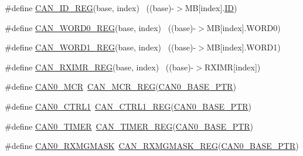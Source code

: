 \begin{DoxyCompactItemize}
\item 
\#define \hyperlink{group___c_a_n___register___accessor___macros_ga081389bb65f5ba1945fa2984d057044e}{C\+A\+N\+\_\+\+I\+D\+\_\+\+R\+EG}(base,  index)                                  ~((base)-\/$>$MB\mbox{[}index\mbox{]}.\hyperlink{samr21__xpro_200std__low__power__mode_200std__low__power__mode_8c_a77ceac8d6af195fe72f95f6afd87c45e}{ID})
\item 
\#define \hyperlink{group___c_a_n___register___accessor___macros_gab486ab7c313c1c3ab3ea1d146a4e4597}{C\+A\+N\+\_\+\+W\+O\+R\+D0\+\_\+\+R\+EG}(base,  index)                            ~((base)-\/$>$MB\mbox{[}index\mbox{]}.W\+O\+R\+D0)
\item 
\#define \hyperlink{group___c_a_n___register___accessor___macros_gabea0fd7f957d3c4e7770f1670aff54dc}{C\+A\+N\+\_\+\+W\+O\+R\+D1\+\_\+\+R\+EG}(base,  index)                            ~((base)-\/$>$MB\mbox{[}index\mbox{]}.W\+O\+R\+D1)
\item 
\#define \hyperlink{group___c_a_n___register___accessor___macros_gabcdb674583aff011e9cae0837f6abd5a}{C\+A\+N\+\_\+\+R\+X\+I\+M\+R\+\_\+\+R\+EG}(base,  index)                            ~((base)-\/$>$R\+X\+I\+MR\mbox{[}index\mbox{]})
\item 
\#define \hyperlink{group___c_a_n___register___accessor___macros_ga300565478bb512e7ca03af0ecf31137a}{C\+A\+N0\+\_\+\+M\+CR}~\hyperlink{group___c_a_n___register___accessor___macros_ga266f3270836a0e2113e665b27e8469c3}{C\+A\+N\+\_\+\+M\+C\+R\+\_\+\+R\+EG}(\hyperlink{group___c_a_n___peripheral_ga1ee8f499e10af9b8e3132e0168e519b9}{C\+A\+N0\+\_\+\+B\+A\+S\+E\+\_\+\+P\+TR})
\item 
\#define \hyperlink{group___c_a_n___register___accessor___macros_gacd647d438a70b740aca411d35aee6de2}{C\+A\+N0\+\_\+\+C\+T\+R\+L1}~\hyperlink{group___c_a_n___register___accessor___macros_gacb8258cf058657f2e55abcfb40b99344}{C\+A\+N\+\_\+\+C\+T\+R\+L1\+\_\+\+R\+EG}(\hyperlink{group___c_a_n___peripheral_ga1ee8f499e10af9b8e3132e0168e519b9}{C\+A\+N0\+\_\+\+B\+A\+S\+E\+\_\+\+P\+TR})
\item 
\#define \hyperlink{group___c_a_n___register___accessor___macros_ga962b913ec16b41232cddb038bdbbf47b}{C\+A\+N0\+\_\+\+T\+I\+M\+ER}~\hyperlink{group___c_a_n___register___accessor___macros_ga1fed1cd31d16a8d3472d1f4f424b4fc8}{C\+A\+N\+\_\+\+T\+I\+M\+E\+R\+\_\+\+R\+EG}(\hyperlink{group___c_a_n___peripheral_ga1ee8f499e10af9b8e3132e0168e519b9}{C\+A\+N0\+\_\+\+B\+A\+S\+E\+\_\+\+P\+TR})
\item 
\#define \hyperlink{group___c_a_n___register___accessor___macros_gae7f04079ef57decb7b0b43b704239ba2}{C\+A\+N0\+\_\+\+R\+X\+M\+G\+M\+A\+SK}~\hyperlink{group___c_a_n___register___accessor___macros_gadda1f2634abb5b3f2d33cd29632be22e}{C\+A\+N\+\_\+\+R\+X\+M\+G\+M\+A\+S\+K\+\_\+\+R\+EG}(\hyperlink{group___c_a_n___peripheral_ga1ee8f499e10af9b8e3132e0168e519b9}{C\+A\+N0\+\_\+\+B\+A\+S\+E\+\_\+\+P\+TR})

\end{DoxyCompactItemize}
